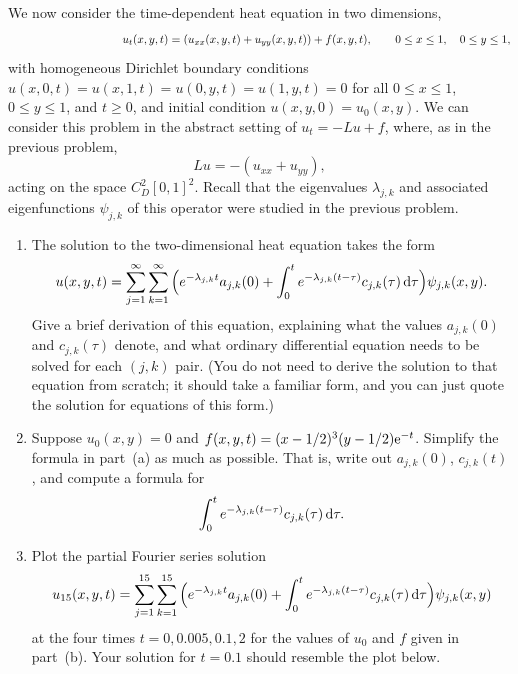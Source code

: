 We now consider the time-dependent heat equation in two dimensions,
\[ \hspace*{10em}u_t(x,y,t) = (u_{xx}(x,y,t) +u_{yy}(x,y,t)) + f(x,y,t), 
   \qquad 0\le x \le 1, \quad 0\le y\le 1,\]
with homogeneous Dirichlet boundary conditions $u(x,0,t)=u(x,1,t)=u(0,y,t)=u(1,y,t)=0$ 
for all $0\le x\le 1$, $0\le y\le 1$, and $t\ge 0$,
and initial condition $u(x,y,0) = u_0(x,y)$.
We can consider this problem in the abstract setting of $u_t = - L u + f$, where,
as in the previous problem,
\[ L u = -(u_{xx} + u_{yy}),\]
acting on the space $C^2_D[0,1]^2$.  
Recall that the eigenvalues $\lambda_{j,k}$ and associated eigenfunctions $\psi_{j,k}$ 
of this operator were studied in the previous problem.

\begin{enumerate}
\item The solution to the two-dimensional heat equation takes the form
      \[ u(x,y,t) = \sum_{j=1}^\infty \sum_{k=1}^\infty 
          \Big(e^{-\lambda_{j,k} t} a_{j,k}(0) + \int_0^t e^{-\lambda_{j,k}(t-\tau)} c_{j,k}(\tau)\, {\rm d} \tau\Big)\psi_{j,k}(x,y).\]
       Give a brief derivation of this equation, explaining what the values $a_{j,k}(0)$ and $c_{j,k}(\tau)$ denote,
       and what ordinary differential equation needs to be solved for each $(j,k)$ pair.  (You do not need to 
       derive the solution to that equation from scratch; it should take a familiar form, and you can just quote
       the solution for equations of this form.)

\item Suppose $u_0(x,y) = 0$ and $f(x,y,t) = (x-1/2)^3 (y-1/2) {\rm e}^{-t}$.  
      Simplify the formula in part~(a) as much as possible.  That is, write out $a_{j,k}(0)$,
      $c_{j,k}(t)$, and compute a formula for
          \[ \int_0^t e^{-\lambda_{j,k}(t-\tau)} c_{j,k}(\tau)\, {\rm d} \tau.\]

\item Plot the partial Fourier series solution 
      \[ u_{15}(x,y,t) = \sum_{j=1}^{15} \sum_{k=1}^{15} 
          \Big(e^{-\lambda_{j,k} t} a_{j,k}(0) + \int_0^t e^{-\lambda_{j,k}(t-\tau)} c_{j,k}(\tau)\, {\rm d} \tau\Big)\psi_{j,k}(x,y)\]
      at the four times $t=0, 0.005, 0.1, 2$ for the values of $u_0$ and $f$ given in part~(b).
      Your solution for $t=0.1$ should resemble the plot below.


\end{enumerate}
